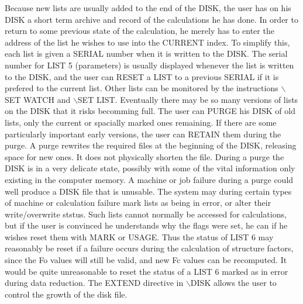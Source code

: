 \documentclass[10pt,a4paper]{report}
\begin{document}
Because new lists are usually added to the end of the DISK, the user has
 on his DISK a short term archive and record of the calculations he has done.
 In order to return to some previous state of the calculation, he merely has
 to enter the address of the list he wishes to use into the CURRENT index.
 To simplify this, each list is given a SERIAL number when it is written to the
 DISK. The serial number for LIST 5 (parameters) is usually
 displayed whenever the list is written to the
 DISK, and the user can RESET a LIST to a previous SERIAL 
 if it is prefered to the current list. Other lists can be monitored by
 the instructions $\backslash$SET WATCH and $\backslash$SET LIST.
 Eventually there may be so many versions of lists on the DISK
 that it risks becomming full. The user can PURGE his DISK of old lists, only
 the current or spacially marked
 ones remaining. If there are some particularly important early
 versions, the user can RETAIN them during the purge. A purge rewrites
 the required files at the beginning of the DISK, releasing space for new ones.
 It does not physically shorten the file. During a purge the DISK is in a very
 delicate state, possibly with some of the vital information only existing
 in the computer memory. A machine or job failure during a purge could well
 produce a DISK file that is unusable. The system may during certain types
 of machine or calculation failure mark lists as being in error, or alter
 their write/overwrite ststus. Such lists cannot normally be accessed for
 calculations, but if the user is convinced he understands why the flags were
 set, he can if he wishes reset them with MARK or USAGE.  Thus the status
 of LIST 6 may reasonably be reset if a failure occurs during the calculation
 of structure factors, since the Fo values will still be valid, and new Fc
 values can be recomputed. It would be quite unreasonable to reset the status
 of a LIST 6 marked as in error during data reduction. The EXTEND directive
 in $\backslash$DISK allows the user to control the growth of the disk file.


 


\bigskip{}




 
\end{document}

